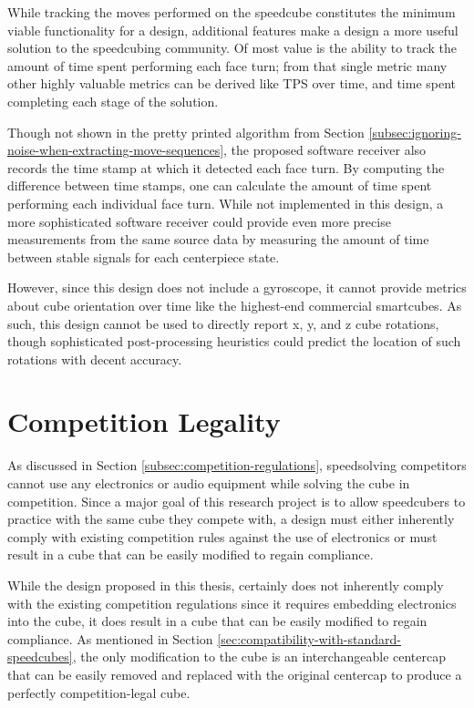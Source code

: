 While tracking the moves performed on the speedcube constitutes the
minimum viable functionality for a design, additional features make a
design a more useful solution to the speedcubing community. Of most
value is the ability to track the amount of time spent performing each
face turn; from that single metric many other highly valuable metrics
can be derived like TPS over time, and time spent completing each stage
of the solution.

Though not shown in the pretty printed algorithm from Section
\ref{subsec:ignoring-noise-when-extracting-move-sequences}, the
proposed software receiver also records the time stamp at which it
detected each face turn. By computing the difference between time
stamps, one can calculate the amount of time spent performing each
individual face turn. While not implemented in this design, a more
sophisticated software receiver could provide even more precise
measurements from the same source data by measuring the amount of time
between stable signals for each centerpiece state.

However, since this design does not include a gyroscope, it cannot
provide metrics about cube orientation over time like the highest-end
commercial smartcubes. As such, this design cannot be used to directly
report x, y, and z cube rotations, though sophisticated post-processing
heuristics could predict the location of such rotations with decent
accuracy.


\section{Competition Legality}
\label{sec:competition-legality}

As discussed in Section \ref{subsec:competition-regulations},
speedsolving competitors cannot use any electronics or audio equipment
while solving the cube in competition. Since a major goal of this
research project is to allow speedcubers to practice with the same cube
they compete with, a design must either inherently comply with existing
competition rules against the use of electronics or must result in a
cube that can be easily modified to regain compliance.

While the design proposed in this thesis, certainly does not inherently
comply with the existing competition regulations since it requires
embedding electronics into the cube, it does result in a cube that can
be easily modified to regain compliance. As mentioned in Section
\ref{sec:compatibility-with-standard-speedcubes}, the only modification
to the cube is an interchangeable centercap that can be easily removed
and replaced with the original centercap to produce a perfectly
competition-legal cube.

